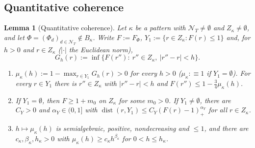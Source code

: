 \documentclass[10pt]{amsart}
\newtheorem{lemma}[theorem]{Lemma}
\theoremstyle{definition}
\theoremstyle{remark}
\newcommand{\dist}{\operatorname{dist}}
\begin{document}
\subsection{Quantitative coherence}\label{subsec:III-QC}

\begin{lemma}[Quantitative coherence]\label{lem:III-QC}
Let $\kappa$ be a pattern with $\mathcal N_T\ne\emptyset$ and $Z_\kappa\ne
\emptyset$, and let $\Phi=(\Phi_d)_{d\in\mathcal N_T}\notin B_\kappa$.  Write $F:=
F_\Phi$, $Y_1:=\{r\in Z_\kappa:F(r)\le1\}$ and, for $h>0$ and $r\in Z_\kappa$
\textup{(}$|\cdot|$ the Euclidean norm\textup{)},
\[
 G_h(r):=\inf\{F(r''):\ r''\in Z_\kappa,\ |r''-r|<h\} .
\]
\begin{enumerate}
\item[(a)] $\mu_\kappa(h):=1-\max_{r\in Y_1}G_h(r)>0$ for every $h>0$
\textup{(}$\mu_\kappa:\equiv1$ if $Y_1=\emptyset$\textup{)}.  For every $r\in Y_1$
there is $r''\in Z_\kappa$ with $|r''-r|<h$ and $F(r'')\le1-\frac34\mu_\kappa(h)$.
\item[(b)] If $Y_1=\emptyset$, then $F\ge1+m_0$ on $Z_\kappa$ for some $m_0>0$.
If $Y_1\ne\emptyset$, there are $C_Y>0$ and $\alpha_Y\in(0,1]$ with
$\dist(r,Y_1)\le C_Y(F(r)-1)_+^{\alpha_Y}$ for all $r\in Z_\kappa$.
\item[(c)] $h\mapsto\mu_\kappa(h)$ is semialgebraic, positive, nondecreasing and
$\le1$, and there are $c_\kappa,\beta_\kappa,h_\kappa>0$ with $\mu_\kappa(h)\ge
c_\kappa h^{\beta_\kappa}$ for $0<h\le h_\kappa$.
\end{enumerate}
\end{lemma}
\end{document}
